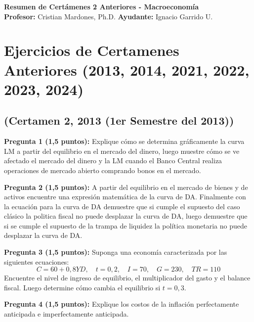\documentclass[11pt,addpoints]{article}
\begin{document}
\vspace*{0.01cm}

\begin{center}
{\Large \bfseries Resumen de Certámenes 2 Anteriores - Macroeconomía \\[0.5cm]}
\textbf{Profesor:} Cristian Mardones, Ph.D. \quad \textbf{Ayudante:} Ignacio Garrido U.
\end{center}

\section*{\textbf{Ejercicios de Certamenes Anteriores (2013, 2014, 2021, 2022, 2023, 2024)}}

\subsection*{(Certamen 2, 2013 (1er Semestre del 2013))}

\textbf{Pregunta 1 (1,5 puntos):}  
Explique cómo se determina gráficamente la curva LM a partir del equilibrio en el mercado del dinero, luego muestre cómo se ve afectado el mercado del dinero y la LM cuando el Banco Central realiza operaciones de mercado abierto comprando bonos en el mercado.

\vspace{0.5cm}
\textbf{Pregunta 2 (1,5 puntos):}  
A partir del equilibrio en el mercado de bienes y de activos encuentre una expresión matemática de la curva de DA. Finalmente con la ecuación para la curva de DA demuestre que si cumple el supuesto del caso clásico la politica fiscal no puede desplazar la curva de DA, luego demuestre que si se cumple el supuesto de la trampa de liquidez la política monetaria no puede desplazar la curva de DA.
\vspace{0.5cm}

\textbf{Pregunta 3 (1,5 puntos):}  
Suponga una economía caracterizada por las siguientes ecuaciones:
\[
C = 60 + 0{,}8YD, \quad t = 0{,}2, \quad I = 70, \quad G = 230, \quad TR = 110
\]
Encuentre el nivel de ingreso de equilibrio, el multiplicador del gasto y el balance fiscal.  
Luego determine cómo cambia el equilibrio si \( t = 0{,}3 \).
 

\vspace{0.5cm}
\textbf{Pregunta 4 (1,5 puntos):}  
Explique los costos de la inflación perfectamente anticipada e imperfectamente anticipada.


\newpage
\vspace*{0.1cm}
\end{document}
